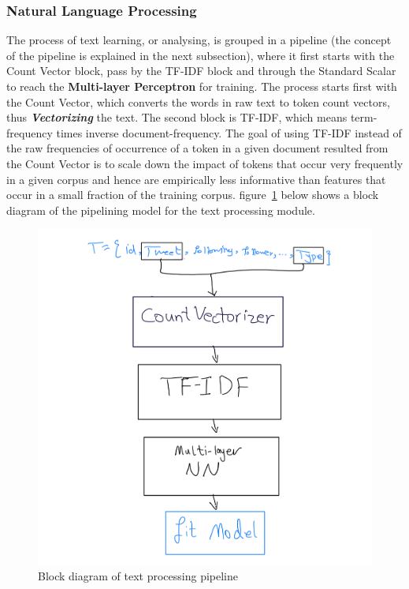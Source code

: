 \documentclass[conference]{IEEEtran}
\begin{document}
\subsubsection{Natural Language Processing}
The process of text learning, or analysing, is grouped in a pipeline (the concept of the pipeline is explained in the next subsection), where it first starts with the Count Vector block, pass by the TF-IDF block and through the Standard Scalar to reach the \textbf{Multi-layer Perceptron} for training. The process starts first with the Count Vector, which converts the words in raw text to token count vectors, thus \textbf{\textit{Vectorizing}} the text. The second block is TF-IDF, which means term-frequency times inverse document-frequency. The goal of using TF-IDF instead of the raw frequencies of occurrence of a token in a given document resulted from the Count Vector is to scale down the impact of tokens that occur very frequently in a given corpus and hence are empirically less informative than features that occur in a small fraction of the training corpus.  figure~\ref{fig:NLP-pipeline} below shows a block diagram of the pipelining model for the text processing module.
\begin{figure}
    \centering
    \includegraphics[scale=0.1]{NLP-pipeline.png}
    \caption{Block diagram of text processing pipeline}
    \label{fig:NLP-pipeline}
\end{figure}
\end{document}
